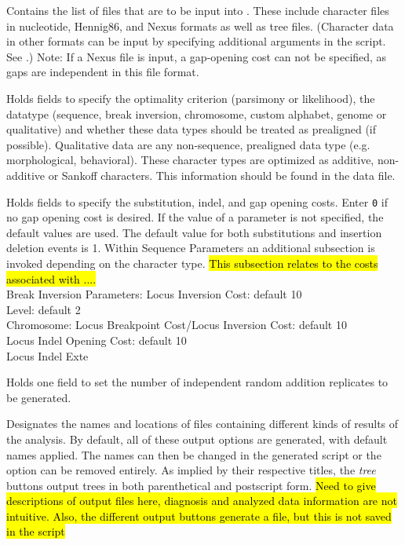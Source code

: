 \begin{description}
\setlength{\labelsep}{5pt}
\setlength{\itemindent}{0pt}%
    \item[Input Files]
        Contains the list of files that are to be input into \poy. These include
        character files in nucleotide, Hennig86, and Nexus formats as well as tree files. (Character data in other formats can be input by specifying additional arguments in the script. See .) Note: If a Nexus file is input, a gap-opening cost can not be specified, as gaps are independent in this file format.
    \item[Input Parameters]
    	Holds fields to specify the optimality criterion (parsimony or likelihood), the datatype (sequence, break inversion, chromosome, custom alphabet, genome or qualitative) and whether these data types should be treated as prealigned (if possible).  Qualitative data are any non-sequence, prealigned data type (e.g. morphological, behavioral).  These character types are optimized as additive, non-additive or Sankoff characters.  This information should be found in the data file.
    \item[Sequence Parameters]
        Holds fields to specify the substitution, indel, and gap opening costs. Enter \texttt{0} if no
        gap opening cost is desired. If the value of a parameter is not specified, the default values are used. The default value for both substitutions and insertion deletion events is 1. Within Sequence Parameters an additional subsection is invoked depending on the character type.  \hl{This subsection relates to the costs associated with ....}\\
        Break Inversion Parameters: 	Locus Inversion Cost: default 10\\
        							Level: default 2\\
        Chromosome: 	Locus Breakpoint Cost/Locus Inversion Cost: default 10\\
        				Locus Indel Opening Cost: default 10\\
				Locus Indel Exte\\
        
    \item[Search Parameters]
        Holds one field to set the number of independent random addition replicates to be generated.
    \item[Output Files]
        Designates the names and locations of files containing different kinds of results of the analysis. 
By default, all of these output options are generated, with default names applied.  The names can then be changed 
in the generated script or the option can be removed entirely.  As implied by their respective titles, the \emph{tree} 
buttons output trees in both parenthetical and postscript form.
        \hl{Need to give descriptions of output files here, diagnosis and analyzed data information are not intuitive.
        Also, the different output buttons generate a file, but this is not saved in the script}
\end{description}


